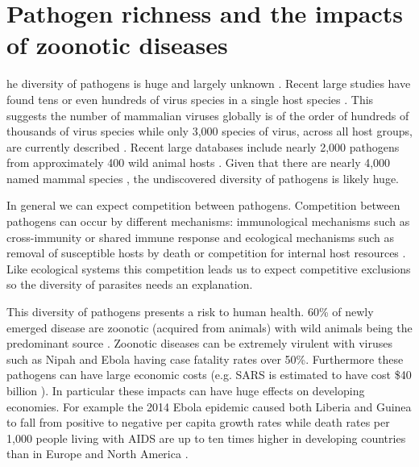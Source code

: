 
\section{Pathogen richness and the impacts of zoonotic diseases}



he diversity of pathogens is huge and largely unknown \cite{poulin2014parasite}.
Recent large studies have found tens \cite{anthony2013strategy} or even hundreds of virus species in a single host species \cite{anthony2015non}.
This suggests the number of mammalian viruses globally is of the order of hundreds of thousands of virus species \cite{anthony2013strategy} while only 3,000 species of virus, across all host groups, are currently described \cite{ICTV}.
Recent large databases include nearly 2,000 pathogens from approximately 400 wild animal hosts \cite{wardeh2015database}.
Given that there are nearly 4,000 named mammal species \cite{wilson2005mammal}, the undiscovered diversity of pathogens is likely huge.

In general we can expect competition between pathogens.
Competition between pathogens can occur by different mechanisms: immunological mechanisms such as cross-immunity or shared immune response \cite{fenton2010applying} and ecological mechanisms such as removal of susceptible hosts by death \cite{rohani2003ecological} or competition for internal host resources \cite{griffiths2014analysis}.
Like ecological systems this competition leads us to expect competitive exclusions \cite{bremermann1989competitive, martcheva2013competitive, ackleh2003competitive, ackleh2014robust, turner2002impact} so the diversity of parasites needs an explanation.


This diversity of pathogens presents a risk to human health.
60\% of newly emerged disease are zoonotic (acquired from animals) with wild animals being the predominant source \cite{jones2008global, woolhouse2006host, taylor2001risk}.
Zoonotic diseases can be extremely virulent with viruses such as Nipah \cite{luby2009recurrent} and Ebola \cite{lefebvre2014case} having case fatality rates over 50\%.
Furthermore these pathogens can have large economic costs (e.g. SARS is estimated to have cost \$40 billion \cite{knobler2004learning}).
In particular these impacts can have huge effects on developing economies.
For example the 2014 Ebola epidemic caused both Liberia and Guinea to fall from positive to negative per capita growth rates \cite{ebolaWorldbank, ebola2015worldbank} while death rates per 1,000 people living with AIDS are up to ten times higher in developing countries than in Europe and North America \cite{granich2015trends}.


